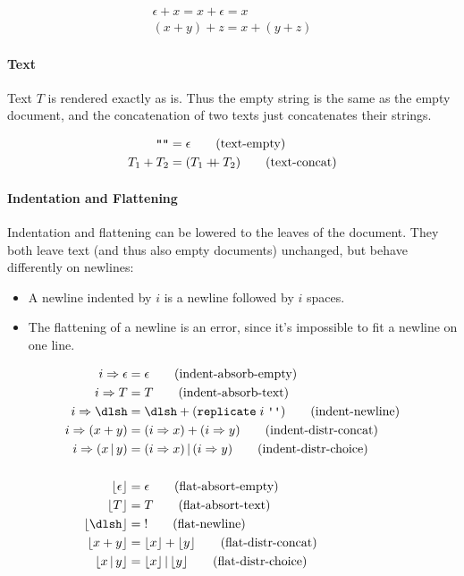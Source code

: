 \documentclass{article}
\newcommand{\txt}{T}
\newcommand{\nil}{{\epsilon}}
\newcommand{\err}{{!}}
\newcommand{\nl}{{\dlsh}}
\newcommand{\ind}[2]{#1 \Rightarrow #2}
\renewcommand{\flat}[1]{\lfloor #1 \rfloor}
\newcommand{\cat}[2]{#1 + #2}
\newcommand{\choice}[2]{#1 \,|\, #2}
\newcommand{\spaces}[1]{\texttt{replicate}\;#1\;\texttt{\textquotesingle \textquotesingle}}
\newcommand{\doubleplus}{\mathbin{+\mkern-8mu+}}
\begin{document}
\begin{gather*}
  \cat{\nil}{x} = \cat{x}{\nil} = x \tag{concat-unit} \\
  \cat{(\cat{x}{y})}{z} = \cat{x}{(\cat{y}{z})} \tag{concat-assoc}
\end{gather*}

\paragraph{Text}
Text $\txt$ is rendered exactly as is. Thus the empty string is the same as the empty document, and
the concatenation of two texts just concatenates their strings.

\begin{align*}
  \texttt{""} &= \nil \tag{text-empty} \\
  \cat{\txt_1}{\txt_2} &= (\txt_1 \doubleplus \txt_2) \tag{text-concat}
\end{align*}

\paragraph{Indentation and Flattening}
Indentation and flattening can be lowered to the leaves of the document.  They both leave text (and
thus also empty documents) unchanged, but behave differently on newlines:
\begin{itemize}
\item A newline indented by $i$ is a newline followed by $i$ spaces.
\item The flattening of a newline is an error, since it's impossible to fit a newline on one line.
\end{itemize}

\begin{align*}
  \ind{i}{\nil} &= \nil
    \tag{indent-absorb-empty} \\
  \ind{i}{\txt} &= \txt
    \tag{indent-absorb-text} \\
  \ind{i}{\nl}  &= \cat{\nl}{(\spaces{i})}
    \tag{indent-newline} \\
  \ind{i}{(\cat{x}{y})} &= \cat{(\ind{i}{x})}{(\ind{i}{y})}
    \tag{indent-distr-concat} \\
  \ind{i}{(\choice{x}{y})} &= \choice{(\ind{i}{x})}{(\ind{i}{y})}
    \tag{indent-distr-choice} \\
  \\
  \flat{\nil} &= \nil
    \tag{flat-absort-empty} \\
  \flat{\txt} &= \txt
    \tag{flat-absort-text} \\
  \flat{\nl} &= \err
    \tag{flat-newline} \\
  \flat{\cat{x}{y}} &= \cat{\flat{x}}{\flat{y}}
    \tag{flat-distr-concat} \\
  \flat{\choice{x}{y}} &= \choice{\flat{x}}{\flat{y}}
    \tag{flat-distr-choice}
\end{align*}
\end{document}
